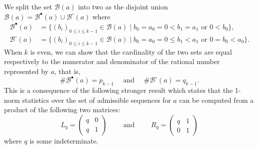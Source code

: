 \documentclass[a4paper,12pt]{amsart}
\newcommand{\Bcal}{{\mathcal{B}}}
\newcommand{\0}{\mathtt{0}}
\newcommand{\1}{\mathtt{1}}
\newcommand{\2}{\mathtt{2}}
\newcommand{\3}{\mathtt{3}}
\begin{document}
We split the set $\Bcal(a)$ into two as the disjoint union
$\Bcal(a)= \Bcal^\bullet(a) \cup \Bcal^\circ(a)$
where
    \begin{align*}
        \Bcal^\bullet(a)
        &=
        \{(b_i)_{0\leq i\leq k-1}
        \in\Bcal(a)
            \mid
            b_0=a_0=0<b_1=a_1
            \text{ or }
            0<b_0
        \},\\
        \Bcal^\circ(a)
        &=
        \{(b_i)_{0\leq i\leq k-1}
        \in\Bcal(a)
            \mid
            b_0=a_0=0\leq b_1<a_1
            \text{ or }
        0=b_0<a_0
    \}.
\end{align*}
When $k$ is even, we can show that the cardinality of the two sets are equal
respectively to the numerator and denominator of the rational number
represented by $a$, that is,
\[
        \#\Bcal^\bullet(a) = p_{k-1}
        \quad
        \text{ and }
        \quad
        \#\Bcal^\circ(a) = q_{k-1}.
\]
This is a consequence of the following stronger result which states that
the 1-norm statistics over the set of admissible sequences for $a$
can be computed from a product of the following two matrices:
\[
    L_q=
\left(\begin{array}{rr}
q & 0 \\
q & 1
\end{array}\right)
\qquad
\text{ and }
\qquad
    R_q=
\left(\begin{array}{rr}
q & 1 \\
0 & 1
\end{array}\right)
\]
where $q$ is some indeterminate.

\newcommand\MainTheoremB{
Let $a=[a_0;\dots,a_{2\ell-1}]$ be the even-length continued fraction expansion
of a positive rational number.
The set of admissible sequences for $a$ satisfies
    \begin{equation*}
    \left(\begin{array}{r}
        \sum_{b\in \Bcal^\bullet(a)} q^{\Vert b\Vert_1}\\
          \sum_{b\in \Bcal^\circ  (a)} q^{\Vert b\Vert_1}
    \end{array}\right)
        =
        \left(\begin{smallmatrix} 1 & 0 \\ 0 & q \end{smallmatrix}\right)^{-1}
        R_q^{a_0}L_q^{a_1}\cdots R_q^{a_{2\ell-2}}L_q^{a_{2\ell-1}}
        \left(\begin{smallmatrix} 1 \\ 0 \end{smallmatrix}\right).
    \end{equation*}
where
$ \Vert b\Vert_1 = b_0+b_1+\dots+b_{2\ell-1} $
    for every admissible sequence $(b_i)_{0\leq i< 2\ell}\in\Bcal(a)$.
}
\end{document}
